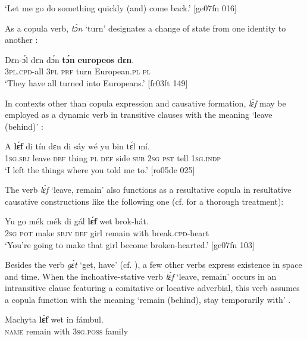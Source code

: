 \glt ‘Let me go do something quickly (and) come back.’ [ge07fn 016]
\z

As a copula verb, \textit{tɔ́n} ‘turn’ designates a change of state from one identity to another :


\ea%
    \label{ex:key:798}
    \gll Dɛn-ɔ́l    dɛn  dɔ́n  \textbf{tɔ́n}    \textbf{europeos}  \textbf{dɛn}.\\
\textsc{3pl.cpd-}all  \textsc{3pl}  \textsc{prf}  turn    European.\textsc{pl}  \textsc{pl}\\

\glt ‘They have all turned into Europeans.’ [fr03ft 149]
\z

In contexts other than copula expression and causative formation, \textit{lɛ́f} may be employed as a dynamic verb in transitive clauses with the meaning ‘leave (behind)’ : 


\ea%
    \label{ex:key:799}
    \gll A    \textbf{lɛ́f}    di  tín    dɛn  di  sáy  wé  yu  bin  tɛ́l  mí.\\
\textsc{1sg.sbj}  leave  \textsc{def}  thing  \textsc{pl}  \textsc{def}  side  \textsc{sub}  \textsc{2sg}  \textsc{pst}  tell  \textsc{1sg.indp}\\

\glt ‘I left the things where you told me to.’ [ro05de 025]
\z

The verb \textit{lɛ́f} ‘leave, remain’ also functions as a resultative copula{\fff} in resultative causative constructions {\fff}like the following one (cf.  for a thorough treatment){\fff}: 


\ea%
    \label{ex:key:800}
    \gll Yu  go  mék    mék  di  gál  \textbf{lɛ́f}    wet    brok-hát.\\
\textsc{2sg}  \textsc{pot}  make  \textsc{sbjv}  \textsc{def}  girl  remain  with    break.\textsc{cpd}{}-heart\\

\glt ‘You’re going to make that girl become broken-hearted.’ [ge07fn 103]
\z

Besides the verb \textit{gɛ́t} ‘get, have’ (cf. ), a few other verbs express existence in space and time. When the inchoative-stative verb \textit{lɛ́f} ‘leave, remain’ occurs in an intransitive clause featuring a comitative or locative adverbial, this verb assumes a copula function with the meaning ‘remain (behind), stay temporarily with’ . 


\ea%
    \label{ex:key:801}
    \gll Machyta    \textbf{lɛ́f}    wet    in    fámbul.\\
\textsc{name}    remain  with    \textsc{3sg.poss}  family\\

